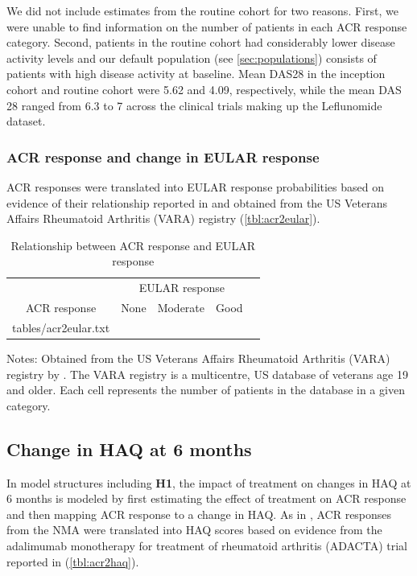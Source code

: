 \documentclass[11pt,final,fleqn]{article}
\makeatletter
\theoremstyle{plain}
\newcommand*\ExpandableInput[1]{\@@input#1 }
\makeatother
\begin{document}
We did not include estimates from the routine cohort for two reasons. First, we were unable to find information on the number of patients in each ACR response category. Second, patients in the routine cohort had considerably lower disease activity levels \citep{aletaha2005simplified, aletaha2005acute} and our default population (see \autoref{sec:populations}) consists of patients with high disease activity at baseline. Mean DAS28 in the inception cohort and routine cohort were 5.62 and 4.09, respectively, while the mean DAS 28 ranged from 6.3 to 7 across the clinical trials making up the Leflunomide dataset.

\subsubsection{ACR response and change in EULAR response}
ACR responses were translated into EULAR response probabilities based on evidence of their relationship reported in \citet{stevenson2016adalimumab} and obtained from the US Veterans Affairs Rheumatoid Arthritis (VARA) registry (\autoref{tbl:acr2eular}).



\begin{table}[!ht]
\begin{center}
\begin{threeparttable}
\caption{Relationship between ACR response and EULAR response} \label{tbl:acr2eular}
\begin{tabularx}{\textwidth}{@{\extracolsep{\fill}}lcccc}
\hline
\multicolumn{1}{l}{} & \multicolumn{3}{c}{EULAR response} \\
\cmidrule{2-4} 
\multicolumn{1}{c}{ACR response} & \multicolumn{1}{c}{None} & \multicolumn{1}{c}{Moderate} & \multicolumn{1}{c}{Good} \\
\hline
\ExpandableInput{tables/acr2eular.txt}
\hline
\end{tabularx}
\scriptsize
Notes: Obtained from the US Veterans Affairs Rheumatoid Arthritis (VARA) registry by \citet{stevenson2016adalimumab}. The VARA registry is a multicentre, US database of veterans age 19 and older. Each cell represents the number of patients in the database in a given category. 
\end{threeparttable}
\end{center}
\end{table}

\subsection{Change in HAQ at 6 months}
In model structures including \textbf{H1}, the impact of treatment on changes in HAQ at 6 months is modeled by first estimating the effect of treatment on ACR response and then mapping ACR response to a change in HAQ. As in \citet{icer2017tim}, ACR responses from the NMA were translated into HAQ scores based on evidence from the adalimumab monotherapy for treatment of rheumatoid arthritis (ADACTA) trial reported in \citet{carlson2015economic} (\autoref{tbl:acr2haq}).
\end{document}
